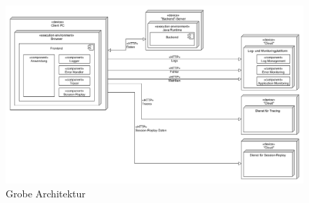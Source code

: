 \begin{figure}[H]
	\centering
	\includegraphics[width=1.00\linewidth]{img/04_erstellung-poc/konzept-simple.png}
	\caption{Grobe Architektur}
	\label{fig:grobe-architektur}
\end{figure}

%
%
%	

